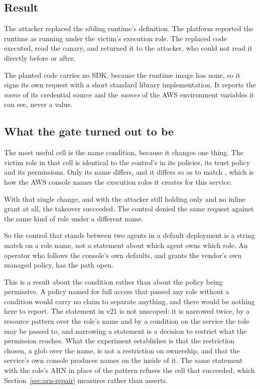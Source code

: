 \subsection{Result}

The attacker replaced the sibling runtime's definition. The platform reported
the runtime as running under the victim's execution role. The replaced code
executed, read the canary, and returned it to the attacker, who could not read
it directly before or after.

The planted code carries no SDK, because the runtime image has none, so it
signs its own request with a short standard library implementation. It
reports the \emph{name} of its credential source and the \emph{names} of the
AWS environment variables it can see, never a value.

\subsection{What the gate turned out to be}

The most useful cell is the name condition, because it changes one thing. The
victim role in that cell is identical to the control's in its policies, its
trust policy and its permissions. Only its name differs, and it differs so as
to match , which is how the AWS console names the
execution roles it creates for this service.

With that single change, and with the attacker still holding only
 and no inline grant at all, the takeover
succeeded. The control denied the same request against the same kind of role
under a different name.

So the control that stands between two agents in a default deployment is a
string match on a role name, not a statement about which agent owns which
role. An operator who follows the console's own defaults, and grants the
vendor's own managed policy, has the path open.

This is a result about the condition rather than about the policy being
permissive. A policy named for full access that passed any role without a
condition would carry no claim to separate anything, and there would be
nothing here to report. The  statement in v21 is not
unscoped: it is narrowed twice, by a resource pattern over the role's name
and by a condition on the service the role may be passed to, and narrowing a
statement is a decision to restrict what the permission reaches. What the
experiment establishes is that the restriction chosen, a glob over the name, is
not a restriction on ownership, and that the service's own console produces
names on the inside of it. The same statement with the role's ARN in place of
the pattern refuses the cell that succeeded, which
Section~\ref{sec:arn-repair} measures rather than asserts.

